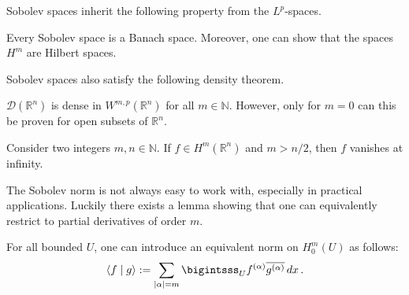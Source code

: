 
    Sobolev spaces inherit the following property from the $L^p$-spaces.
    \begin{property}[Completeness]
        Every Sobolev space is a Banach space. Moreover, one can show that the spaces $H^m$ are Hilbert spaces.
    \end{property}
    Sobolev spaces also satisfy the following density theorem.
    \begin{property}
        $\mathcal{D}(\mathbb{R}^n)$ is dense in $W^{m,p}(\mathbb{R}^n)$ for all $m\in\mathbb{N}$. However, only for $m=0$ can this be proven for open subsets of $\mathbb{R}^n$.
    \end{property}

    \begin{property}
        Consider two integers $m,n\in\mathbb{N}$. If $f\in H^m(\mathbb{R}^n)$ and $m>n/2$, then $f$ vanishes at infinity.
    \end{property}

    The Sobolev norm is not always easy to work with, especially in practical applications. Luckily there exists a lemma showing that one can equivalently restrict to partial derivatives of order $m$.
    \begin{theorem}[Friedrich]
        For all bounded $U$, one can introduce an equivalent norm on $H^m_0(U)$ as follows:
        \begin{gather}
            \langle f\mid g \rangle := \sum_{|\alpha|=m}\bigintsss_U f^{(\alpha)}\overline{g^{(\alpha)}}\,dx\,.
        \end{gather}
    \end{theorem}

